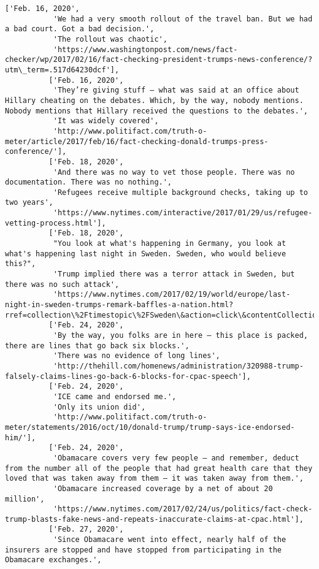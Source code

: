 \documentclass[11pt]{article}
\begin{document}
\begin{Verbatim}[commandchars=\\\{\}]
          ['Feb. 16, 2020',
           'We had a very smooth rollout of the travel ban. But we had a bad court. Got a bad decision.',
           'The rollout was chaotic',
           'https://www.washingtonpost.com/news/fact-checker/wp/2017/02/16/fact-checking-president-trumps-news-conference/?utm\_term=.517d64230dcf'],
          ['Feb. 16, 2020',
           'They’re giving stuff — what was said at an office about Hillary cheating on the debates. Which, by the way, nobody mentions. Nobody mentions that Hillary received the questions to the debates.',
           'It was widely covered',
           'http://www.politifact.com/truth-o-meter/article/2017/feb/16/fact-checking-donald-trumps-press-conference/'],
          ['Feb. 18, 2020',
           'And there was no way to vet those people. There was no documentation. There was no nothing.',
           'Refugees receive multiple background checks, taking up to two years',
           'https://www.nytimes.com/interactive/2017/01/29/us/refugee-vetting-process.html'],
          ['Feb. 18, 2020',
           "You look at what's happening in Germany, you look at what's happening last night in Sweden. Sweden, who would believe this?",
           'Trump implied there was a terror attack in Sweden, but there was no such attack',
           'https://www.nytimes.com/2017/02/19/world/europe/last-night-in-sweden-trumps-remark-baffles-a-nation.html?rref=collection\%2Ftimestopic\%2FSweden\&action=click\&contentCollection=world\&region=stream\&module=stream\_unit\&version=latest\&contentPlacement=7\&pgtype=collection'],
          ['Feb. 24, 2020',
           'By the way, you folks are in here — this place is packed, there are lines that go back six blocks.',
           'There was no evidence of long lines',
           'http://thehill.com/homenews/administration/320988-trump-falsely-claims-lines-go-back-6-blocks-for-cpac-speech'],
          ['Feb. 24, 2020',
           'ICE came and endorsed me.',
           'Only its union did',
           'http://www.politifact.com/truth-o-meter/statements/2016/oct/10/donald-trump/trump-says-ice-endorsed-him/'],
          ['Feb. 24, 2020',
           'Obamacare covers very few people — and remember, deduct from the number all of the people that had great health care that they loved that was taken away from them — it was taken away from them.',
           'Obamacare increased coverage by a net of about 20 million',
           'https://www.nytimes.com/2017/02/24/us/politics/fact-check-trump-blasts-fake-news-and-repeats-inaccurate-claims-at-cpac.html'],
          ['Feb. 27, 2020',
           'Since Obamacare went into effect, nearly half of the insurers are stopped and have stopped from participating in the Obamacare exchanges.',

\end{Verbatim}
\end{document}
